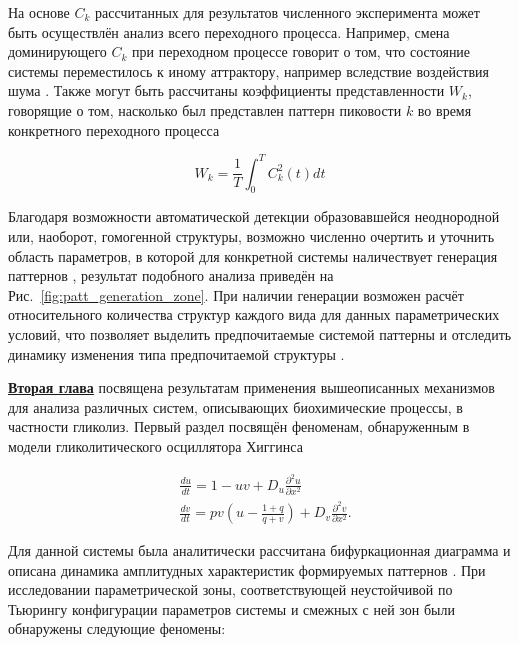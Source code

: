 На основе $C_k$ рассчитанных для результатов численного эксперимента может быть осуществлён анализ всего переходного процесса. Например, смена доминирующего $C_k$ при переходном процессе говорит о том, что состояние системы переместилось к иному аттрактору, например вследствие воздействия шума \cite{bib4}. Также могут быть рассчитаны коэффициенты представленности $W_k$, говорящие о том, насколько был представлен паттерн пиковости $k$ во время конкретного переходного процесса

\begin{equation}
    W_k=\frac{1}{T} \int_0^T C_k^2(t) d t
\end{equation}

Благодаря возможности автоматической детекции образовавшейся неоднородной или, наоборот, гомогенной структуры, возможно численно очертить и уточнить область параметров, в которой для конкретной системы наличествует генерация паттернов \cite{bib2}, результат подобного анализа приведён на Рис.~\ref{fig:patt_generation_zone}. При наличии генерации возможен расчёт относительного количества структур каждого вида для данных параметрических условий, что позволяет выделить предпочитаемые системой паттерны и отследить динамику изменения типа предпочитаемой структуры \cite{bib4}.

\begin{figure}[ht]
\end{figure}

\underline{\textbf{Вторая глава}} посвящена результатам применения вышеописанных механизмов для анализа различных систем, описывающих биохимические процессы, в частности гликолиз. Первый раздел посвящён феноменам, обнаруженным в модели гликолитического осциллятора Хиггинса \cite{higgins1964chemical}

\begin{equation}
    \begin{aligned}
        & \frac{d u}{d t}=1-u v+D_u \frac{\partial^2 u}{\partial x^2} \\
        & \frac{d v}{d t}=p v\left(u-\frac{1+q}{q+v}\right)+D_v \frac{\partial^2 v}{\partial x^2} .
        \end{aligned}
\end{equation}

Для данной системы была аналитически рассчитана бифуркационная диаграмма и описана динамика амплитудных характеристик формируемых паттернов \cite{bib1}. При исследовании параметрической зоны, соответствующей неустойчивой по Тьюрингу конфигурации параметров системы и смежных с ней зон были обнаружены следующие феномены:

